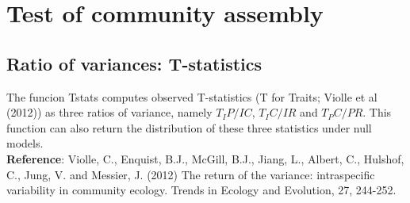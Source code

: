 \documentclass[12pt]{article}\usepackage[]{graphicx}\usepackage[]{color}
\begin{document}
\newpage

\section{Test of community assembly}

\subsection{Ratio of variances: T-statistics}

The funcion Tstats computes observed T-statistics (T for Traits; Violle et al (2012)) as three ratios of variance, namely $T_IP/IC$, $T_IC/IR$ and $T_PC/PR$. This function can also return the distribution of these three statistics under null models.
\\

\textbf{Reference}: Violle, C., Enquist, B.J., McGill, B.J., Jiang, L., Albert, C., Hulshof, C., Jung, V. and Messier, J. (2012) The return of the variance: intraspecific variability in community ecology. Trends in Ecology and Evolution, 27, 244-252.
\end{document}
